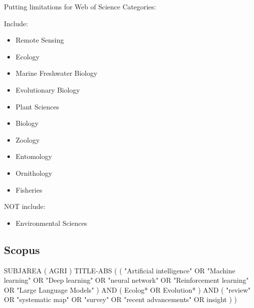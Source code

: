 \documentclass{article}
\newcommand{\bei}{\begin{itemize}}
\newcommand{\eei}{\end{itemize}}
\begin{document}
Putting limitations for Web of Science Categories:

Include:
\bei
\item Remote Sensing
\item Ecology
\item Marine Freshwater Biology
\item Evolutionary Biology
\item Plant Sciences
\item Biology
\item Zoology
\item Entomology
\item Ornithology
\item Fisheries
\eei
NOT include:
\bei
\item Environmental Sciences
\eei

\subsection{Scopus}
SUBJAREA ( AGRI ) TITLE-ABS ( ( "Artificial intelligence" OR "Machine learning" OR "Deep learning" OR "neural network" OR "Reinforcement learning" OR "Large Language Models" ) AND ( Ecolog* OR Evolution* ) AND ( "review" OR "systematic map" OR "survey" OR "recent advancements" OR insight ) )
\end{document}
